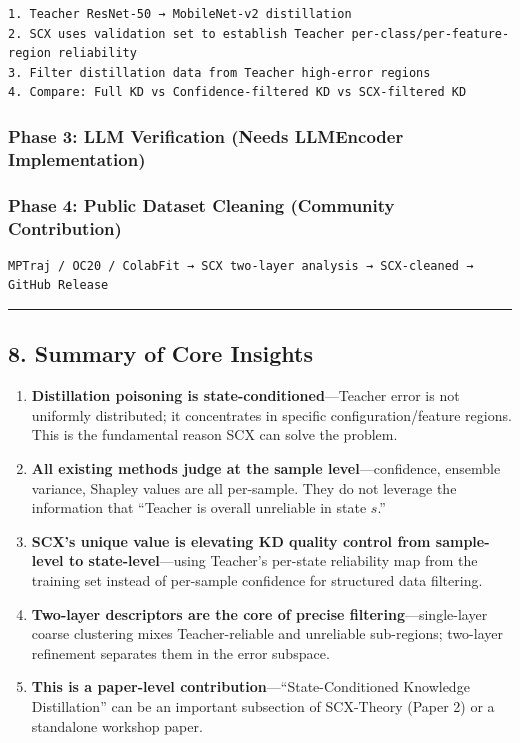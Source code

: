 \documentclass[
  12pt,
]{article}
\begin{document}
\begin{verbatim}
1. Teacher ResNet-50 → MobileNet-v2 distillation
2. SCX uses validation set to establish Teacher per-class/per-feature-region reliability
3. Filter distillation data from Teacher high-error regions
4. Compare: Full KD vs Confidence-filtered KD vs SCX-filtered KD
\end{verbatim}

\subsubsection{Phase 3: LLM Verification (Needs LLMEncoder Implementation)}\label{phase-3-llm-verification}

\subsubsection{Phase 4: Public Dataset Cleaning (Community Contribution)}\label{phase-4-public-dataset-cleaning}

\begin{verbatim}
MPTraj / OC20 / ColabFit → SCX two-layer analysis → SCX-cleaned → GitHub Release
\end{verbatim}

\begin{center}\rule{0.5\linewidth}{0.5pt}\end{center}

\subsection{8. Summary of Core Insights}\label{summary-of-core-insights}

\begin{enumerate}
\def\labelenumi{\arabic{enumi}.}
\item
  \textbf{Distillation poisoning is state-conditioned}---Teacher error is not uniformly distributed; it concentrates in specific configuration/feature regions. This is the fundamental reason SCX can solve the problem.
\item
  \textbf{All existing methods judge at the sample level}---confidence, ensemble variance, Shapley values are all per-sample. They do not leverage the information that ``Teacher is overall unreliable in state $s$.''
\item
  \textbf{SCX's unique value is elevating KD quality control from sample-level to state-level}---using Teacher's per-state reliability map from the training set instead of per-sample confidence for structured data filtering.
\item
  \textbf{Two-layer descriptors are the core of precise filtering}---single-layer coarse clustering mixes Teacher-reliable and unreliable sub-regions; two-layer refinement separates them in the error subspace.
\item
  \textbf{This is a paper-level contribution}---``State-Conditioned Knowledge Distillation'' can be an important subsection of SCX-Theory (Paper 2) or a standalone workshop paper.
\end{enumerate}
\end{document}
